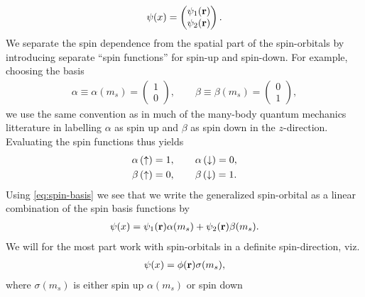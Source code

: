         \begin{align}
            \psi(x) = \begin{pmatrix}
                \psi_1(\mathbf{r}) \\
                \psi_2(\mathbf{r})
            \end{pmatrix}.
        \end{align}
        We separate the spin dependence from the spatial part of the
        spin-orbitals by introducing separate ``spin functions'' for spin-up and
        spin-down.
        For example, choosing the basis
        \begin{align}
            \alpha \equiv \alpha(m_s) = \begin{pmatrix}
                1 \\
                0
            \end{pmatrix},
            \qquad
            \beta \equiv \beta(m_s) = \begin{pmatrix}
                0 \\
                1
            \end{pmatrix},
            \label{eq:spin-basis}
        \end{align}
        we use the same convention as in much of the many-body quantum mechanics
        litterature in labelling $\alpha$ as spin up and $\beta$ as spin down in
        the $z$-direction.
        Evaluating the spin functions thus yields
        \begin{gather}
            \alpha\left( \uparrow \right) = 1, \qquad \alpha\left( \downarrow \right) = 0, \\
            \beta\left( \uparrow \right) = 0, \qquad \beta\left( \downarrow \right) = 1.
        \end{gather}
        Using \autoref{eq:spin-basis} we see that we write the
        generalized spin-orbital as a linear combination of the spin basis
        functions by
        \begin{align}
            \psi(x)
            = \psi_1(\mathbf{r})\alpha(m_s)
            + \psi_2(\mathbf{r})\beta(m_s).
            \label{eq:general-spin-orbital-1}
        \end{align}
        We will for the most part work with spin-orbitals in a definite
        spin-direction, viz.
        \begin{align}
            \psi(x) = \phi(\mathbf{r})\sigma(m_s),
            \label{eq:spin-orbital}
        \end{align}
        where $\sigma(m_s)$ is either spin up $\alpha(m_s)$ or spin down
